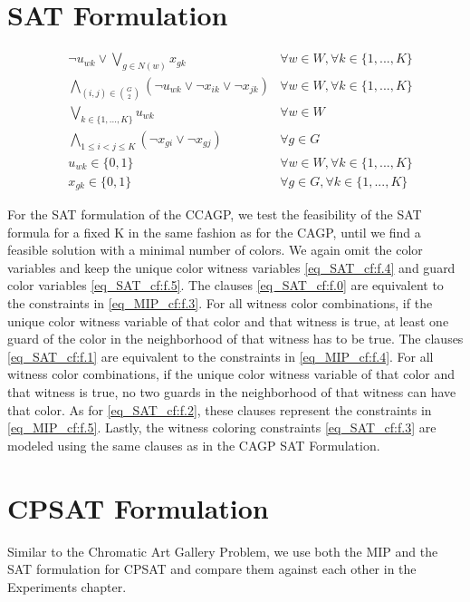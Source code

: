 \section{SAT Formulation}

\begin{align}
\label{eq_SAT_cf:f.0}&\lnot u_{wk} \lor \bigvee_{g \in N(w)}x_{gk} & \forall w \in W, \forall k\in \{1,...,K\}\\
\label{eq_SAT_cf:f.1}&\bigwedge_{(i,j)\in {G\choose 2}} (\lnot u_{wk} \lor \lnot x_{ik} \lor \lnot x_{jk}) & \forall w \in W, \forall k\in \{1,...,K\}\\
\label{eq_SAT_cf:f.2}&\bigvee_{k\in \{1,...,K\}}u_{wk} & \forall w\in W\\
\label{eq_SAT_cf:f.3}&\bigwedge_{1 \leq i < j \leq K} (\lnot x_{gi} \lor \lnot x_{gj}) & \forall g\in G\\
\label{eq_SAT_cf:f.4}& u_{wk} \in \{0,1\} & \forall w\in W, \forall k\in \{1,...,K\}\\
\label{eq_SAT_cf:f.5}& x_{gk} \in \{0,1\} & \forall g\in G, \forall k\in \{1,...,K\}
\end{align}

For the SAT formulation of the CCAGP, we test the feasibility of the SAT formula for a fixed K in the same fashion as for the CAGP, until we find a feasible solution with a minimal number of colors. We again omit the color variables and keep the unique color witness variables \cref{eq_SAT_cf:f.4} and guard color variables \cref{eq_SAT_cf:f.5}. The clauses \cref{eq_SAT_cf:f.0} are equivalent to the constraints in \cref{eq_MIP_cf:f.3}. For all witness color combinations, if the unique color witness variable of that color and that witness is true, at least one guard of the color in the neighborhood of that witness has to be true. The clauses \cref{eq_SAT_cf:f.1} are equivalent to the constraints in \cref{eq_MIP_cf:f.4}. For all witness color combinations, if the unique color witness variable of that color and that witness is true, no two guards in the neighborhood of that witness can have that color. As for \cref{eq_SAT_cf:f.2}, these clauses represent the constraints in \cref{eq_MIP_cf:f.5}. Lastly, the witness coloring constraints \cref{eq_SAT_cf:f.3} are modeled using the same clauses as in the CAGP SAT Formulation.

\section{CPSAT Formulation}
Similar to the Chromatic Art Gallery Problem, we use both the MIP and the SAT formulation for CPSAT and compare them against each other in the Experiments chapter.

